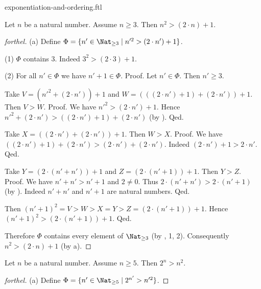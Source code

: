 \documentclass{naproche-library}
\begin{document}
\begin{smodule}{exponentiation-and-ordering.ftl}
  \begin{proposition}[forthel,id=ARITHMETIC_09_134060414337024]
    Let $n$ be a natural number.
    Assume $n \geq 3$.
    Then $n^{2} > (2 \cdot n) + 1$.
  \end{proposition}
  \begin{proof}[forthel]
    (a) Define $\Phi = \{ n' \in \Nat_{\geq 3} \mid n'^{2} > (2 \cdot n') + 1 \}$.

    (1) $\Phi$ contains $3$.
    Indeed $3^{2} > (2 \cdot 3) + 1$.

    (2) For all $n' \in \Phi$ we have $n' + 1 \in \Phi$. \newline
    Proof.
      Let $n' \in \Phi$.
      Then $n' \geq 3$.

      Take $V = (n'^{2} + (2 \cdot n')) + 1$ and $W = (((2 \cdot n') + 1) + (2 \cdot n')) + 1$.
      Then $V > W$. \newline
      Proof.
        We have $n'^{2} > (2 \cdot n') + 1$.
        Hence $n'^{2} + (2 \cdot n') > ((2 \cdot n') + 1) + (2 \cdot n')$ (by ).
      Qed.

      Take $X = ((2 \cdot n') + (2 \cdot n')) + 1$.
      Then $W > X$. \newline
      Proof.
        We have $((2 \cdot n') + 1) + (2 \cdot n') > (2 \cdot n') + (2 \cdot n')$.
        Indeed $(2 \cdot n') + 1 > 2 \cdot n'$.
      Qed.

      Take $Y = (2 \cdot (n' + n')) + 1$ and $Z = (2 \cdot (n' + 1)) + 1$.
      Then $Y > Z$. \newline
      Proof.
        We have $n' + n' > n' + 1$ and $2 \neq 0$.
        Thus $2 \cdot (n' + n') > 2 \cdot (n' + 1)$ (by ).
        Indeed $n' + n'$ and $n' + 1$ are natural numbers.
      Qed.

      Then $(n' + 1)^{2} = V > W > X = Y > Z = (2 \cdot (n' + 1)) + 1$.
      Hence $(n' + 1)^{2} > (2 \cdot (n' + 1)) + 1$.
    Qed.

    Therefore $\Phi$ contains every element of $\Nat_{\geq 3}$ (by , 1, 2).
    Consequently $n^{2} > (2 \cdot n) + 1$ (by a).
  \end{proof}

  \begin{proposition}[forthel,id=ARITHMETIC_09_1097950367318016]
    Let $n$ be a natural number.
    Assume $n \geq 5$.
    Then $2^{n} > n^{2}$.
  \end{proposition}
  \begin{proof}[forthel]
    (a) Define $\Phi = \{ n' \in \Nat_{\geq 5} \mid 2^{n'} > n'^{2} \}$.


\end{proof}
\end{smodule}
\end{document}
